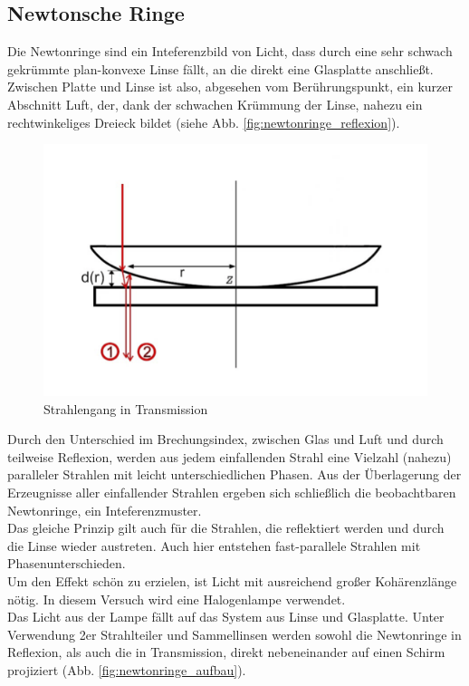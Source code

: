 \documentclass[12pt,a4paper]{article}
\begin{document}
\begin{multicols}{2}
\section{Newtonsche Ringe}

Die Newtonringe sind ein Inteferenzbild von Licht, dass durch eine sehr schwach gekrümmte plan-konvexe Linse fällt, an die direkt eine Glasplatte anschließt. Zwischen Platte und Linse ist also, abgesehen vom Berührungspunkt, ein kurzer Abschnitt Luft, der, dank der schwachen Krümmung der Linse, nahezu ein rechtwinkeliges Dreieck bildet (siehe Abb. \ref{fig:newtonringe_reflexion}).\\


\begin{figure}[H]
	\centering
	\includegraphics[scale=0.80]{./figure/newtonringe_strahlengang.png}
	\caption{Strahlengang in Transmission}
	\label{fig:newtonringe_transmission}
\end{figure}


Durch den Unterschied im Brechungsindex, zwischen Glas und Luft und durch teilweise Reflexion, werden aus jedem einfallenden Strahl eine Vielzahl (nahezu) paralleler Strahlen mit leicht unterschiedlichen Phasen. Aus der Überlagerung der Erzeugnisse aller einfallender Strahlen ergeben sich schließlich die beobachtbaren Newtonringe, ein Inteferenzmuster.\\
Das gleiche Prinzip gilt auch für die Strahlen, die reflektiert werden und durch die Linse wieder austreten. Auch hier entstehen fast-parallele Strahlen mit Phasenunterschieden.\\
Um den Effekt schön zu erzielen, ist Licht mit ausreichend großer Kohärenzlänge nötig. In diesem Versuch wird eine Halogenlampe verwendet.
\\
Das Licht aus der Lampe fällt auf das System aus Linse und Glasplatte. Unter Verwendung 2er Strahlteiler und Sammellinsen werden sowohl die Newtonringe in Reflexion, als auch die in Transmission, direkt nebeneinander auf einen Schirm projiziert (Abb. \ref{fig:newtonringe_aufbau}).


\end{multicols}
\end{document}
